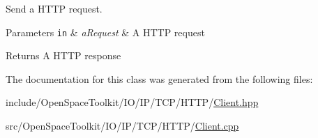 Send a H\+T\+TP request. 


\begin{DoxyParams}[1]{Parameters}
\mbox{\tt in}  & {\em a\+Request} & A H\+T\+TP request \\
\hline
\end{DoxyParams}
\begin{DoxyReturn}{Returns}
A H\+T\+TP response 
\end{DoxyReturn}


The documentation for this class was generated from the following files\+:\begin{DoxyCompactItemize}
\item 
include/\+Open\+Space\+Toolkit/\+I\+O/\+I\+P/\+T\+C\+P/\+H\+T\+T\+P/\hyperlink{_h_t_t_p_2_client_8hpp}{Client.\+hpp}\item 
src/\+Open\+Space\+Toolkit/\+I\+O/\+I\+P/\+T\+C\+P/\+H\+T\+T\+P/\hyperlink{_client_8cpp}{Client.\+cpp}\end{DoxyCompactItemize}
